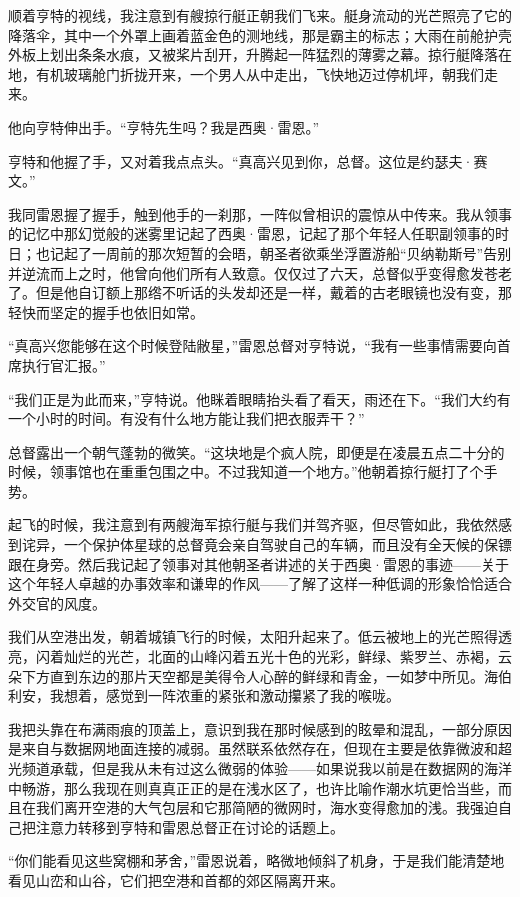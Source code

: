 \documentclass[AutoFakeBold=true]{book}
\begin{document}
顺着亨特的视线，我注意到有艘掠行艇正朝我们飞来。艇身流动的光芒照亮了它的降落伞，其中一个外罩上画着蓝金色的测地线，那是霸主的标志；大雨在前舱护壳外板上划出条条水痕，又被桨片刮开，升腾起一阵猛烈的薄雾之幕。掠行艇降落在地，有机玻璃舱门折拢开来，一个男人从中走出，飞快地迈过停机坪，朝我们走来。

他向亨特伸出手。``亨特先生吗？我是西奥·雷恩。''

亨特和他握了手，又对着我点点头。``真高兴见到你，总督。这位是约瑟夫·赛文。''

我同雷恩握了握手，触到他手的一刹那，一阵似曾相识的震惊从中传来。我从领事的记忆中那{\kaishu 幻觉般}的迷雾里记起了西奥·雷恩，记起了那个年轻人任职副领事的时日；也记起了一周前的那次短暂的会晤，朝圣者欲乘坐浮置游船``贝纳勒斯号''告别并逆流而上之时，他曾向他们所有人致意。仅仅过了六天，总督似乎变得愈发苍老了。但是他自订额上那绺不听话的头发却还是一样，戴着的古老眼镜也没有变，那轻快而坚定的握手也依旧如常。

``真高兴您能够在这个时候登陆敝星，''雷恩总督对亨特说，``我有一些事情需要向首席执行官汇报。''

``我们正是为此而来，''亨特说。他眯着眼睛抬头看了看天，雨还在下。``我们大约有一个小时的时间。有没有什么地方能让我们把衣服弄干？''

总督露出一个朝气蓬勃的微笑。``这块地是个疯人院，即便是在凌晨五点二十分的时候，领事馆也在重重包围之中。不过我知道一个地方。''他朝着掠行艇打了个手势。

起飞的时候，我注意到有两艘海军掠行艇与我们并驾齐驱，但尽管如此，我依然感到诧异，一个保护体星球的总督竟会亲自驾驶自己的车辆，而且没有全天候的保镖跟在身旁。然后我记起了领事对其他朝圣者讲述的关于西奥·雷恩的事迹——关于这个年轻人卓越的办事效率和谦卑的作风——了解了这样一种低调的形象恰恰适合外交官的风度。

我们从空港出发，朝着城镇飞行的时候，太阳升起来了。低云被地上的光芒照得透亮，闪着灿烂的光芒，北面的山峰闪着五光十色的光彩，鲜绿、紫罗兰、赤褐，云朵下方直到东边的那片天空都是美得令人心醉的鲜绿和青金，一如梦中所见。{\kaishu 海伯利安}，我想着，感觉到一阵浓重的紧张和激动攥紧了我的喉咙。

我把头靠在布满雨痕的顶盖上，意识到我在那时候感到的眩晕和混乱，一部分原因是来自与数据网地面连接的减弱。虽然联系依然存在，但现在主要是依靠微波和超光频道承载，但是我从未有过这么微弱的体验——如果说我以前是在数据网的海洋中畅游，那么我现在则真真正正的是在浅水区了，也许比喻作潮水坑更恰当些，而且在我们离开空港的大气包层和它那简陋的微网时，海水变得愈加的浅。我强迫自己把注意力转移到亨特和雷恩总督正在讨论的话题上。

``你们能看见这些窝棚和茅舍，''雷恩说着，略微地倾斜了机身，于是我们能清楚地看见山峦和山谷，它们把空港和首都的郊区隔离开来。
\end{document}
